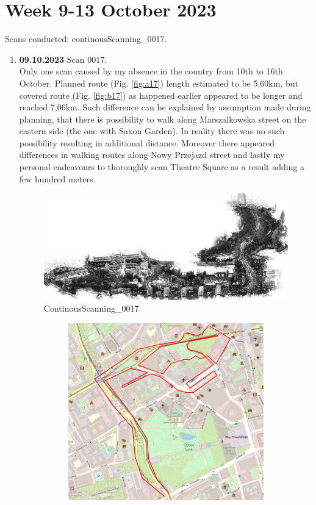\documentclass[a4paper,12pt]{book}
\begin{document}
\section{Week 9-13 October 2023}
Scans conducted: continousScanning\_0017.\\
\begin{enumerate}
	\item \textbf{09.10.2023} Scan 0017. \\
	Only one scan caused by my absence in the country from 10th to 16th October. Planned route (Fig. \ref{fig:a17}) length estimated to be 5,60km, but covered route (Fig. \ref{fig:b17}) as happened earlier appeared to be longer and reached 7,06km. Such difference can be explained by assumption made during planning, that there is possibility to walk along Marszalkowska street on the eastern side (the one with Saxon Garden). In reality there was no such possibility resulting in additional distance. Moreover there appeared differences in walking routes along Nowy Przejazd street and lastly my personal endeavours to thoroughly scan Theatre Square as a result adding a few hundred meters.
	\begin{figure}[H]
		\includegraphics[width=1\linewidth]{cloud17}
		\caption{ContinousScanning\_0017}
	\end{figure}
	\begin{figure}[H]
		\centering
		\begin{subfigure}{.75\textwidth}
			\centering
			\includegraphics[width=1\linewidth]{route_p17}

\end{subfigure}
\end{figure}
\end{enumerate}
\end{document}
